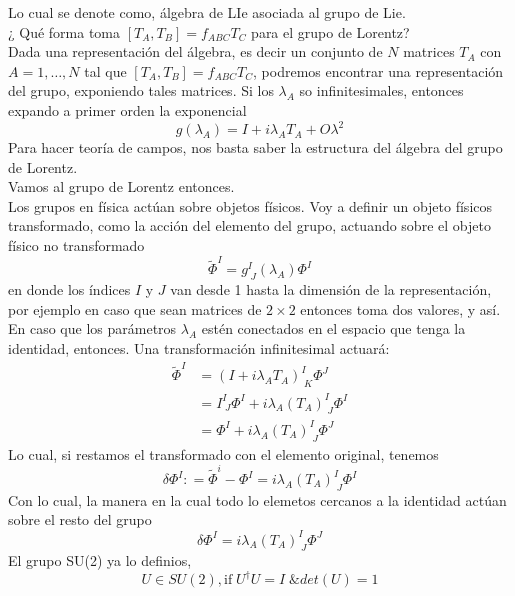 Lo cual se denote como, álgebra de LIe asociada al grupo de Lie. \\
¿ Qué forma toma $[T_A,T_B] = f_{ABC}T_C$ para el grupo de Lorentz? \\
Dada una representación del álgebra, es decir un conjunto de $N$ matrices $T_A$ con $A=1,\dots,N$ tal que $[T_A,T_B]=f_{ABC}T_C$, podremos encontrar una representación del grupo, exponiendo tales matrices. Si los $\lambda_A$ so infinitesimales, entonces expando a primer orden la exponencial
\begin{equation}
  g(\lambda_A) = I + i\lambda_AT_A + O{\lambda^2}
\end{equation}
Para hacer teoría de campos, nos basta saber la estructura del álgebra del grupo de Lorentz. \\
Vamos al grupo de Lorentz entonces. \\
Los grupos en física actúan sobre objetos físicos. Voy a definir un objeto físicos transformado, como la acción del elemento del grupo, actuando sobre el objeto físico no transformado
\begin{equation*}
  \tilde{\Phi}^I = g^I_{\; J}(\lambda_A)\Phi^I
\end{equation*}
en donde los índices $I$ y $J$ van desde 1 hasta la dimensión de la representación, por ejemplo en caso que sean matrices de $2\times 2$ entonces toma dos valores, y así. \\
En caso que los parámetros $\lambda_A$ estén conectados en el espacio que tenga la identidad, entonces. Una transformación infinitesimal actuará:
\begin{align*}
  \tilde{\Phi}^I & = \left( I + i\lambda_A T_A \right)^I_{\; K}\Phi^J \\
  & = I^I_{\; J} \Phi^I + i\lambda_A \left(T_A\right)^I_{\; J}\Phi^I \\
  & = \Phi^I + i\lambda_A \left(T_A\right)^I_{\;J}\Phi^J 
\end{align*}
Lo cual, si restamos el transformado con el elemento original, tenemos
\begin{equation*}
  \delta \Phi^I : = \tilde{\Phi}^i - \Phi^I = i\lambda_A\left(T_A\right)^I_{\; J}\Phi^I 
\end{equation*}
Con lo cual, la manera en la cual todo lo elemetos cercanos a la identidad actúan sobre el resto del grupo
\begin{equation}
  \boxed{  \delta \Phi^I  = i\lambda_A\left(T_A\right)^I_{\; J}\Phi^J}
\end{equation}
El grupo SU(2) ya lo definios, 
\begin{equation*}
  U\in SU(2) ,\text{if}\; U^\dagger U = I \; \& det(U) = 1  
\end{equation*}
